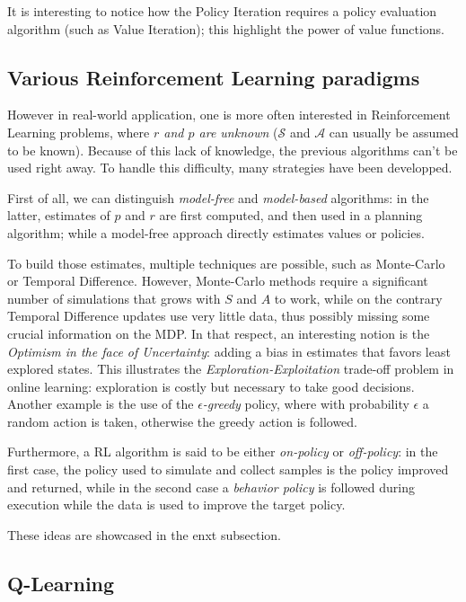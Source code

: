 It is interesting to notice how the Policy Iteration requires a policy evaluation algorithm (such as Value Iteration); this highlight the power of value functions.

\subsection{Various Reinforcement Learning paradigms}
\label{subsec:RL-paradigms}

However in real-world application, one is more often interested in Reinforcement Learning problems, where \emph{$r$ and $p$ are unknown} ($\mathcal{S}$ and $\mathcal{A}$ can usually be assumed to be known). Because of this lack of knowledge, the previous algorithms can't be used right away. To handle this difficulty, many strategies have been developped.

First of all, we can distinguish \emph{model-free} and \emph{model-based} algorithms: in the latter, estimates of $p$ and $r$ are first computed, and then used in a planning algorithm; while a model-free approach directly estimates values or policies.

To build those estimates, multiple techniques are possible, such as Monte-Carlo or Temporal Difference. However, Monte-Carlo methods require a significant number of simulations that grows with $S$ and $A$ to work, while on the contrary Temporal Difference updates use very little data, thus possibly missing some crucial information on the MDP. In that respect, an interesting notion is the \emph{Optimism in the face of Uncertainty}: adding a bias in estimates that favors least explored states. This illustrates the \emph{Exploration-Exploitation} trade-off problem in online learning: exploration is costly but necessary to take good decisions. Another example is the use of the \emph{$\epsilon$-greedy} policy, where with probability $\epsilon$ a random action is taken, otherwise the greedy action is followed.

Furthermore, a RL algorithm is said to be either \emph{on-policy} or \emph{off-policy}: in the first case, the policy used to simulate and collect samples is the policy improved and returned, while in the second case a \emph{behavior policy} is followed during execution while the data is used to improve the target policy.

These ideas are showcased in the enxt subsection.

\subsection{Q-Learning}
\label{subsec:Rl-QL}

